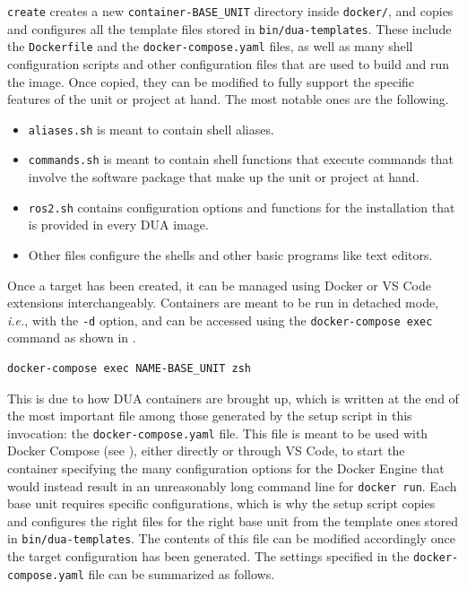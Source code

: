 \texttt{create} creates a new \texttt{container-BASE\_UNIT} directory inside \texttt{docker/}, and copies and configures all the template files stored in \texttt{bin/dua-templates}. These include the \texttt{Dockerfile} and the \texttt{docker-compose.yaml} files, as well as many shell configuration scripts and other configuration files that are used to build and run the image. Once copied, they can be modified to fully support the specific features of the unit or project at hand. The most notable ones are the following.
\begin{itemize}
  \item \texttt{aliases.sh} is meant to contain shell aliases.
  \item \texttt{commands.sh} is meant to contain shell functions that execute commands that involve the software package that make up the unit or project at hand.
  \item \texttt{ros2.sh} contains configuration options and functions for the \ROS installation that is provided in every DUA image.
  \item Other files configure the shells and other basic programs like text editors.
\end{itemize}
Once a target has been created, it can be managed using Docker or VS Code extensions interchangeably. Containers are meant to be run in detached mode, \emph{i.e.}, with the \texttt{-d} option, and can be accessed using the \texttt{docker-compose exec} command as shown in .
\begin{center}
\begin{minipage}[t]{.9\textwidth}
\begin{lstlisting}[caption=Docker Compose command to open an instance of the Zsh shell inside a DUA container., label={lst:duazsh}]
docker-compose exec NAME-BASE_UNIT zsh
\end{lstlisting}
\end{minipage}
\end{center}
This is due to how DUA containers are brought up, which is written at the end of the most important file among those generated by the setup script in this invocation: the \texttt{docker-compose.yaml} file. This file is meant to be used with Docker Compose (see ), either directly or through VS Code, to start the container specifying the many configuration options for the Docker Engine that would instead result in an unreasonably long command line for \texttt{docker run}. Each base unit requires specific configurations, which is why the setup script copies and configures the right files for the right base unit from the template ones stored in \texttt{bin/dua-templates}. The contents of this file can be modified accordingly once the target configuration has been generated. The settings specified in the \texttt{docker-compose.yaml} file can be summarized as follows.
